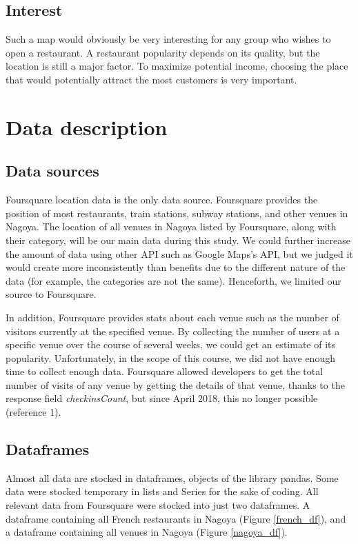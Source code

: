 \documentclass[12pt,a4paper]{article}
\begin{document}
\subsection{Interest}

Such a map would obviously be very interesting for any group who wishes to open a restaurant. A restaurant popularity depends on its quality, but the location is still a major factor. To maximize potential income, choosing the place that would potentially attract the most customers is very important.

\section{Data description}

\subsection{Data sources}

Foursquare location data is the only data source. Foursquare provides the position of most restaurants, train stations, subway stations, and other venues in Nagoya. The location of all venues in Nagoya listed by Foursquare, along with their category, will be our main data during this study. We could further increase the amount of data using other API such as Google Maps's API, but we judged it would create more inconsistently than benefits due to the different nature of the data (for example, the categories are not the same). Henceforth, we limited our source to Foursquare.

\medskip

In addition, Foursquare provides stats about each venue such as the number of visitors currently at the specified venue. By collecting the number of users at a specific venue over the course of several weeks, we could get an estimate of its popularity. Unfortunately, in the scope of this course, we did not have enough time to collect enough data.  Foursquare allowed developers to get the total number of visits of any venue by getting the details of that venue, thanks to the response field \textit{checkinsCount}, but since April 2018, this no longer possible (reference 1).

\subsection{Dataframes}

Almost all data are stocked in dataframes, objects of the library pandas. Some data were stocked temporary in lists and Series for the sake of coding.
All relevant data from Foursquare were stocked into just two dataframes. A dataframe containing all French restaurants in Nagoya (Figure \ref{french_df}), and a dataframe containing all venues in Nagoya (Figure \ref{nagoya_df}).
\end{document}
